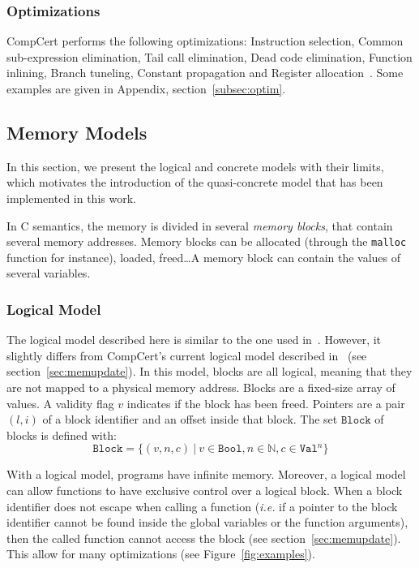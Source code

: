 \subsubsection{Optimizations}
CompCert performs the following optimizations:
Instruction selection, Common sub-expression elimination, Tail call elimination, Dead code elimination, Function inlining, Branch tuneling, Constant propagation and Register allocation~\cite{compcertoverview}. Some examples are given in Appendix, section~\ref{subsec:optim}.
 

\subsection{Memory Models}
\label{subsec:models}
In this section, we present the logical and concrete models with their limits, which motivates the introduction of the quasi-concrete model that has been implemented in this work.

In C semantics, the memory is divided in several \textit{memory blocks}, that contain several memory addresses. Memory blocks can be allocated (through the \texttt{malloc} function for instance), loaded, freed\dots A memory block can contain the values of several variables. 
\subsubsection{Logical Model}
The logical model described here is similar to the one used in~\cite{DBLP:conf/pldi/KangHMGZV15}. However, it slightly differs from CompCert's current logical model described in~\cite{leroy:hal-00703441} (see section~\ref{sec:memupdate}).
In this model, blocks are all logical, meaning that they are not mapped to a physical memory address.
Blocks are a fixed-size array of values.
A validity flag $v$ indicates if the block has been freed.
Pointers are a pair $(l,i)$ of a block identifier and an offset inside that block.
The set $\texttt{Block}$ of blocks is defined with:
$$\texttt{Block}=\{(v,n,c)~|~v\in\texttt{Bool},n\in\mathbb{N},c\in\texttt{Val}^{n}\}$$

With a logical model, programs have infinite memory.
Moreover, a logical model can allow functions to have exclusive control over a logical block.
When a block identifier does not escape when calling a function (\textit{i.e.} if a pointer to the block identifier cannot be found inside the global variables or the function arguments), then the called function cannot access the block (see section~\ref{sec:memupdate}).
This allow for many optimizations (see Figure~\ref{fig:examples}).

